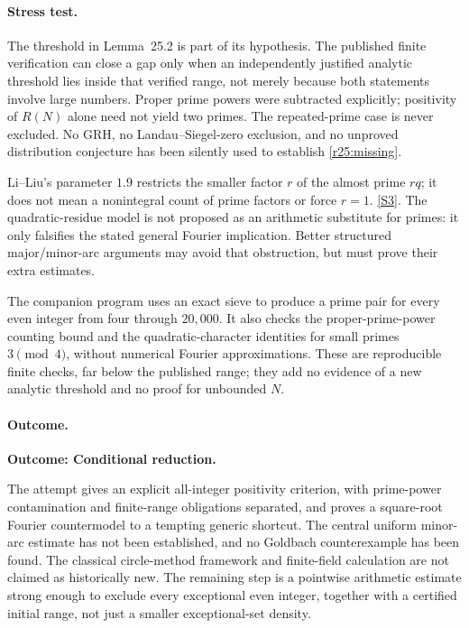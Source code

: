 \documentclass[11pt,a4paper]{article}
\newcommand{\sref}[2]{\hyperlink{source:#1:#2}{[S#2]}}
\numberwithin{equation}{section}
\begin{document}
\paragraph{Stress test.}
The threshold in Lemma~25.2 is part of its hypothesis. The published
finite verification can close a gap only when an independently justified
analytic threshold lies inside that verified range, not merely because
both statements involve large numbers. Proper prime powers were
subtracted explicitly; positivity of $R(N)$ alone need not yield two
primes. The repeated-prime case is never excluded. No GRH, no
Landau--Siegel-zero exclusion, and no unproved distribution conjecture
has been silently used to establish \eqref{r25:missing}.

Li--Liu's parameter $1.9$ restricts the smaller factor $r$ of the almost
prime $rq$; it does not mean a nonintegral count of prime factors or force
$r=1$. \sref{25}{3}. The quadratic-residue model is not proposed as an
arithmetic substitute for primes: it only falsifies the stated general
Fourier implication. Better structured major/minor-arc arguments may
avoid that obstruction, but must prove their extra estimates.

The companion program uses an exact sieve to produce a prime pair for
every even integer from four through $20{,}000$. It also checks the
proper-prime-power counting bound and the quadratic-character identities
for small primes $3\pmod4$, without numerical Fourier approximations.
These are reproducible finite checks, far below the published range;
they add no evidence of a new analytic threshold and no proof for
unbounded $N$.

\paragraph{Outcome.}
\textbf{Outcome: Conditional reduction.}

The attempt gives an explicit all-integer positivity criterion, with
prime-power contamination and finite-range obligations separated, and
proves a square-root Fourier countermodel to a tempting generic shortcut.
The central uniform minor-arc estimate has not been established, and no
Goldbach counterexample has been found. The classical circle-method
framework and finite-field calculation are not claimed as historically
new. The remaining step is a pointwise arithmetic estimate strong enough
to exclude every exceptional even integer, together with a certified
initial range, not just a smaller exceptional-set density.
\end{document}
